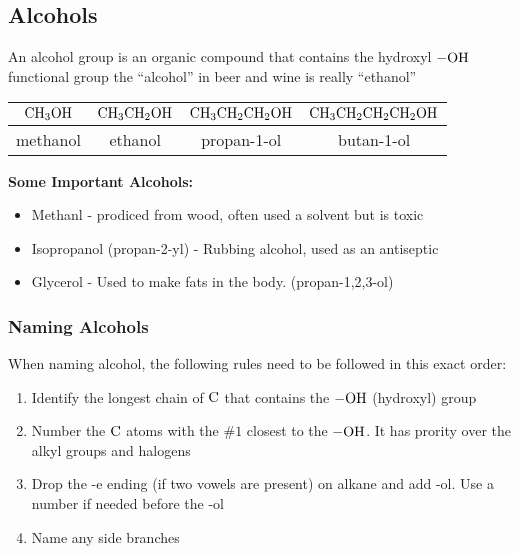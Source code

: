 \documentclass[12pt, a4paper]{article}
\begin{document}
    \subsection{Alcohols}

    An alcohol group is an organic compound that contains the hydroxyl $\ce{-OH}$ functional group
    the ``alcohol'' in beer and wine is really ``ethanol''

    \begin{center}
        \begin{tabular}{| c | c | c | c |}
            \hline
            $\ce{CH3OH}$ & $\ce{CH3CH2OH}$ & $\ce{CH3CH2CH2OH}$ & $\ce{CH3CH2CH2CH2OH}$\\
            \hline
            methanol & ethanol & propan-1-ol & butan-1-ol \\
            \hline
        \end{tabular}
    \end{center}

    \noindent\textbf{Some Important Alcohols:}
    \begin{itemize}
        \item Methanl - prodiced from wood, often used a solvent but is toxic
        \item Isopropanol (propan-2-yl) - Rubbing alcohol, used as an antiseptic
        \item Glycerol - Used to make fats in the body. (propan-1,2,3-ol)
    \end{itemize}

    \subsubsection{Naming Alcohols}

    When naming alcohol, the following rules need to be followed in this exact order:

    \begin{center}
        \begin{enumerate}
            \item Identify the longest chain of $\ce{C}$ that contains the $\ce{-OH}$ (hydroxyl) group
            \item Number the $\ce{C}$ atoms with the \#$1$ closest to the $\ce{-OH}$. It has prority over the alkyl 
                  groups and halogens
            \item Drop the -e ending (if two vowels are present) on alkane and add -ol. Use a number
                  if needed before the -ol
            \item Name any side branches %
    
        \end{enumerate}
    \end{center}
\end{document}
